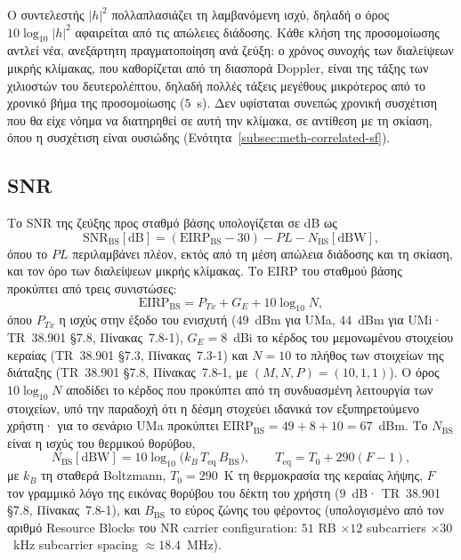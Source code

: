 Ο συντελεστής $|h|^2$ πολλαπλασιάζει τη λαμβανόμενη ισχύ, δηλαδή ο όρος
$10\log_{10}|h|^2$ αφαιρείται από τις απώλειες διάδοσης. Κάθε κλήση της
προσομοίωσης αντλεί νέα, ανεξάρτητη πραγματοποίηση ανά ζεύξη: ο χρόνος
συνοχής των διαλείψεων μικρής κλίμακας, που καθορίζεται από τη διασπορά
Doppler, είναι της τάξης των χιλιοστών του δευτερολέπτου, δηλαδή πολλές
τάξεις μεγέθους μικρότερος από το χρονικό βήμα της προσομοίωσης ($5$~s).
Δεν υφίσταται συνεπώς χρονική συσχέτιση που θα είχε νόημα να διατηρηθεί σε
αυτή την κλίμακα, σε αντίθεση με τη σκίαση, όπου η συσχέτιση είναι
ουσιώδης (Ενότητα~\ref{subsec:meth-correlated-sf}).

\subsection{SNR}

Το SNR της ζεύξης προς σταθμό βάσης υπολογίζεται σε dB ως
\begin{equation}
\text{SNR}_{\text{BS}}[\text{dB}] = (\text{EIRP}_{\text{BS}} - 30) - PL - N_{\text{BS}}[\text{dBW}],
\label{eq:snr-bs}
\end{equation}
όπου το $PL$ περιλαμβάνει πλέον, εκτός από τη μέση απώλεια διάδοσης και τη
σκίαση, και τον όρο των διαλείψεων μικρής κλίμακας. Το EIRP του σταθμού
βάσης προκύπτει από τρεις συνιστώσες:
\begin{equation}
\text{EIRP}_{\text{BS}} = P_{Tx} + G_E + 10\log_{10}N,
\label{eq:eirp-bs}
\end{equation}
όπου $P_{Tx}$ η ισχύς στην έξοδο του ενισχυτή ($49$~dBm για UMa, $44$~dBm
για UMi· TR~38.901 §7.8, Πίνακας~7.8-1), $G_E = 8$~dBi το κέρδος του
μεμονωμένου στοιχείου κεραίας (TR~38.901 §7.3, Πίνακας~7.3-1) και $N = 10$
το πλήθος των στοιχείων της διάταξης (TR~38.901 §7.8, Πίνακας~7.8-1, με
$(M,N,P)=(10,1,1)$). Ο όρος $10\log_{10}N$ αποδίδει το κέρδος που
προκύπτει από τη συνδυασμένη λειτουργία των στοιχείων, υπό την παραδοχή
ότι η δέσμη στοχεύει ιδανικά τον εξυπηρετούμενο χρήστη· για το σενάριο UMa
προκύπτει $\text{EIRP}_{\text{BS}} = 49 + 8 + 10 = 67$~dBm. Το
$N_{\text{BS}}$ είναι η ισχύς του θερμικού θορύβου,
\begin{equation}
N_{\text{BS}}[\text{dBW}] = 10\log_{10}\!\big(k_B \, T_{\text{eq}} \, B_{\text{BS}}\big),
\qquad T_{\text{eq}} = T_0 + 290(F - 1),
\label{eq:noise-power}
\end{equation}
με $k_B$ τη σταθερά Boltzmann, $T_0 = 290$~K τη θερμοκρασία της κεραίας
λήψης, $F$ τον γραμμικό λόγο της εικόνας θορύβου του δέκτη του χρήστη
($9$~dB· TR~38.901 §7.8, Πίνακας~7.8-1), και $B_{\text{BS}}$ το εύρος
ζώνης του φέροντος
(υπολογισμένο από τον αριθμό Resource Blocks του NR carrier
configuration: $51$ RB $\times 12$ subcarriers $\times 30$~kHz subcarrier
spacing $\approx 18.4$~MHz).

